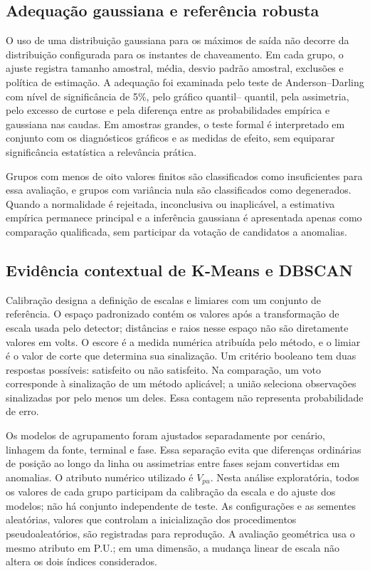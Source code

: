 \documentclass[
	12pt,				%
	openright,			%
	oneside,			%
	a4paper,			%
	chapter=TITLE,		%
	section=TITLE,		%
	subsection=TITLE,	%
	subsubsection=TITLE,%
	english,			%
	brazilian			%
	]{abntex2}
\theoremstyle{definition}
\begin{document}
\subsection{Adequação gaussiana e referência robusta}

O uso de uma distribuição gaussiana para os máximos de saída não decorre da
distribuição configurada para os instantes de chaveamento. Em cada grupo, o
ajuste registra tamanho amostral, média, desvio padrão amostral, exclusões e
política de estimação. A adequação foi examinada pelo teste de
Anderson--Darling com nível de significância de 5\%, pelo gráfico quantil--
quantil, pela assimetria, pelo excesso de curtose e pela diferença entre as
probabilidades empírica e gaussiana nas caudas. Em amostras grandes, o teste
formal é interpretado em conjunto com os diagnósticos gráficos e as medidas
de efeito, sem equiparar significância estatística a relevância prática.

Grupos com menos de oito valores finitos são classificados como insuficientes
para essa avaliação, e grupos com variância nula são classificados como
degenerados. Quando a normalidade é rejeitada, inconclusiva ou inaplicável, a
estimativa empírica permanece principal e a inferência gaussiana é apresentada
apenas como comparação qualificada, sem participar da votação de
candidatos a anomalias.

\subsection{Evidência contextual de K-Means e DBSCAN}
\label{sec:metodo-anomalias}

Calibração designa a definição de escalas e limiares com um conjunto de
referência. O espaço padronizado contém os valores após a transformação
de escala usada pelo detector; distâncias e raios nesse espaço não são
diretamente valores em volts. O escore é a medida numérica atribuída pelo
método, e o limiar é o valor de corte que determina sua sinalização.
Um critério booleano tem duas respostas possíveis: satisfeito ou não
satisfeito. Na comparação, um voto corresponde à sinalização de um método
aplicável; a união seleciona observações sinalizadas por pelo menos um deles.
Essa contagem não representa probabilidade de erro.

Os modelos de agrupamento foram ajustados separadamente por cenário,
linhagem da fonte, terminal e
fase. Essa separação evita que diferenças ordinárias de posição ao longo da
linha ou assimetrias entre fases sejam convertidas em anomalias. O atributo
numérico utilizado é $V_{pu}$. Nesta análise exploratória, todos os valores
de cada grupo participam da calibração da escala e do ajuste dos modelos;
não há conjunto independente de teste. As configurações e as sementes
aleatórias, valores que controlam a inicialização dos procedimentos
pseudoaleatórios, são registradas para reprodução. A avaliação geométrica usa
o mesmo atributo em P.U.; em uma dimensão, a mudança linear de escala
não altera os dois índices considerados.
\end{document}
